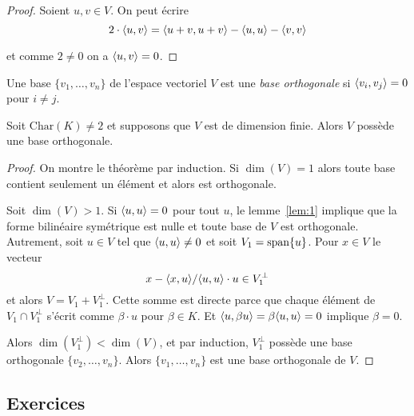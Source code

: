 \begin{proof}
  Soient $u,v \in V$. 
  On peut écrire
  \begin{displaymath}
   2 \cdot  \langle {u,v} \rangle = \langle {u+v,u+v} \rangle - \langle {u,u} \rangle - \langle {v,v} \rangle 
  \end{displaymath}

et comme $2 \neq 0$ on a $\langle {u,v} \rangle = 0$. 
\end{proof}


\begin{definition}
  \label{def:38}
  Une base $\{v_1,\dots,v_n\}$
  de l'espace vectoriel $V$
  est une \emph{base orthogonale} si $\langle {v_i,v_j} \rangle=0$
  pour $i\neq j$.
\end{definition} 

\begin{theorem}
  \label{thr:5}
  Soit $\mathrm{Char}(K)\neq 2$
  et supposons que $V$
  est de dimension finie. Alors $V$ possède une base orthogonale.
\end{theorem}


\begin{proof}
  On montre le théorème par induction. Si $\dim(V) = 1$ alors toute base contient seulement un élément et alors est orthogonale. 

Soit $\dim(V) >1$.  Si $\langle {u,u} \rangle = 0$ pour tout $u$, le lemme~\ref{lem:1} implique que la forme bilinéaire symétrique est nulle et toute base de $V$  est orthogonale.  
Autrement, soit $u \in V$ tel que $\langle {u,u} \rangle \neq 0$ et soit $V_1 = \operatorname{span}\{u\}$. Pour  $x \in V$ le vecteur 
\begin{displaymath}
  x - \langle {x,u} \rangle/\langle {u,u} \rangle \cdot  u \in V_1^\perp
\end{displaymath}
et alors $V = V_1 + V_1^\perp$. Cette somme est directe parce que chaque élément de $V_1 \cap V_1^\perp$ s'écrit comme $\beta \cdot u$ pour $\beta \in K$. Et $\langle {u,\beta u} \rangle = \beta \langle {u,u} \rangle = 0$ implique $\beta = 0$. 

Alors $\dim(V_1^\perp) < \dim(V)$, et par induction, $V_1^\perp$ possède une base orthogonale $\{v_2,\dots,v_n\}$. Alors $\{v_1,\dots,v_n\}$ est une base orthogonale de $V$. 
\end{proof}  


\subsection*{Exercices} 

